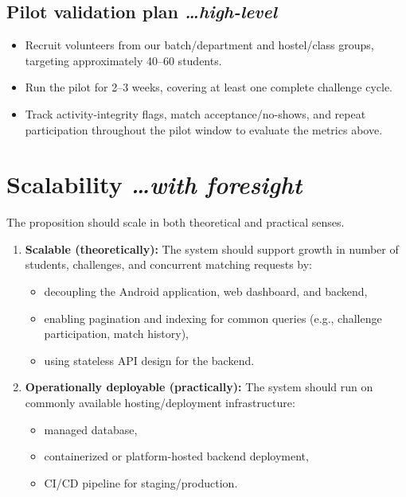 \documentclass[11pt,a4paper]{article}
\newcommand{\BvrHint}[1]{%
  {\normalfont\normalsize\itshape\hfill #1}}
\begin{document}
\subsection{Pilot validation plan %
\BvrHint{\ldots high-level}}
\begin{itemize}[leftmargin=0.7cm]
    \item Recruit volunteers from our batch/department and hostel/class groups, targeting approximately 40--60 students.
    \item Run the pilot for 2--3 weeks, covering at least one complete challenge cycle.
    \item Track activity-integrity flags, match acceptance/no-shows, and repeat participation throughout the pilot window to evaluate the metrics above.
\end{itemize}

\section{Scalability %
\BvrHint{\ldots with foresight}}
The proposition should scale in both theoretical and practical senses.

\begin{enumerate}[leftmargin=0.7cm]
    \item \textbf{Scalable (theoretically):} The system should support growth in number of students, challenges, and concurrent matching requests by:
    \begin{itemize}[leftmargin=0.7cm]
        \item decoupling the Android application, web dashboard, and backend,
        \item enabling pagination and indexing for common queries (e.g., challenge participation, match history),
        \item using stateless API design for the backend.
    \end{itemize}

    \item \textbf{Operationally deployable (practically):} The system should run on commonly available hosting/deployment infrastructure:
    \begin{itemize}[leftmargin=0.7cm]
        \item managed database,
        \item containerized or platform-hosted backend deployment,
        \item CI/CD pipeline for staging/production.
    \end{itemize}
\end{enumerate}
\end{document}
